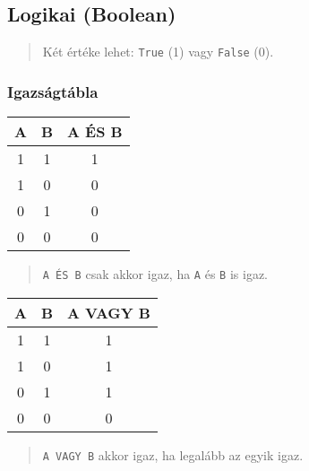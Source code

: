 \clearpage
\subsection{Logikai (Boolean)}
\begin{quote}
    Két értéke lehet: \texttt{True} (1) vagy \texttt{False} (0).
\end{quote}

\subsubsection{Igazságtábla}
\begin{minipage}{0.5\textwidth}
    \begin{center}
        \begin{tabular}{|c|c|c|}
            \hline
            \textbf{A} & \textbf{B} & \textbf{A ÉS B} \\
            \hline
            1 & 1 & 1 \\
            1 & 0 & 0 \\
            0 & 1 & 0 \\
            0 & 0 & 0 \\
            \hline
        \end{tabular}

        \begin{quote}
            \texttt{A ÉS B} csak akkor igaz, ha \texttt{A} és \texttt{B} is igaz.
        \end{quote}
    \end{center}
\end{minipage}
\begin{minipage}{0.5\textwidth}
    \begin{center}
        \begin{tabular}{|c|c|c|}
            \hline
            \textbf{A} & \textbf{B} & \textbf{A VAGY B} \\
            \hline
            1 & 1 & 1 \\
            1 & 0 & 1 \\
            0 & 1 & 1 \\
            0 & 0 & 0 \\
            \hline
        \end{tabular}
    \end{center}
    \begin{quote}
        \texttt{A VAGY B} akkor igaz, ha legalább az egyik igaz.
    \end{quote}
\end{minipage}

